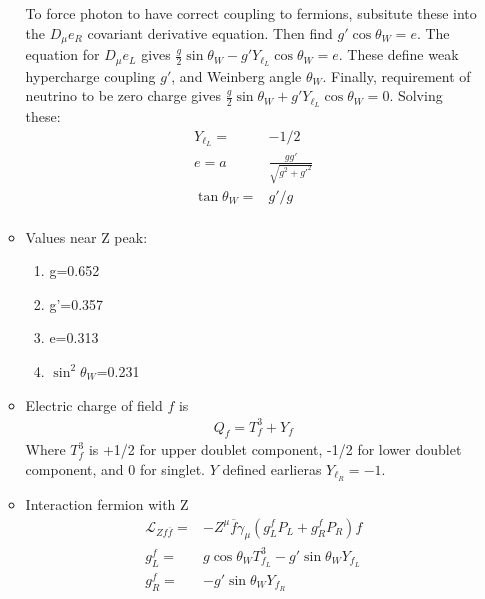 \begin{itemize}
\begin{itemize}
        To force photon to have correct coupling to fermions, subsitute these into the $D_\mu e_R$ covariant derivative equation. Then find $g'\cos{\theta_W}=e$. The equation for $D_\mu e_L$ gives $\frac{g}{2}\sin{\theta_W}-g'Y_{\ell_L}\cos{\theta_W}=e$. These define weak hypercharge coupling $g'$, and Weinberg angle $\theta_W$. Finally, requirement of neutrino to be zero charge gives $\frac{g}{2}\sin{\theta_W}+g'Y_{\ell_L}\cos{\theta_W}=0$. Solving these:
        \begin{equation}\begin{split}
        Y_{\ell_L}=&-1/2 \\
        e=a&\frac{gg'}{\sqrt{g^2+g'^2}} \\
        \tan{\theta_W}=&g'/g \\
        \end{split}\end{equation}
        \item Values near Z peak: \cite{wells}
        \begin{enumerate}
            \item g=0.652 \cite{wells}
            \item g'=0.357 \cite{wells}
            \item e=0.313 \cite{wells}
            \item $\sin^2\theta_W$=0.231 \cite{wells}
        \end{enumerate}
        \item Electric charge of field $f$ is \cite{wells}
            \begin{equation}\begin{split}
            Q_f=T_f^3+Y_f
            \end{split}\end{equation}
            Where $T_f^3$ is +1/2 for upper doublet component, -1/2 for lower doublet component, and 0 for singlet. $Y$ defined earlieras $Y_{\ell_R}=-1$.
        \item Interaction fermion with Z \cite{wells}
        \begin{equation}\begin{split}
        \mathcal{L}_{Zf\overline{f}}=&-Z^\mu\overline{f}\gamma_\mu(g_L^fP_L+g_R^fP_R)f \\
        g_L^f=&g\cos\theta_WT^3_{f_L}-g'\sin\theta_WY_{f_L} \\
        g_R^f=&-g'\sin\theta_WY_{f_R} \\
        \end{split}\end{equation}

\end{itemize}
\end{itemize}
